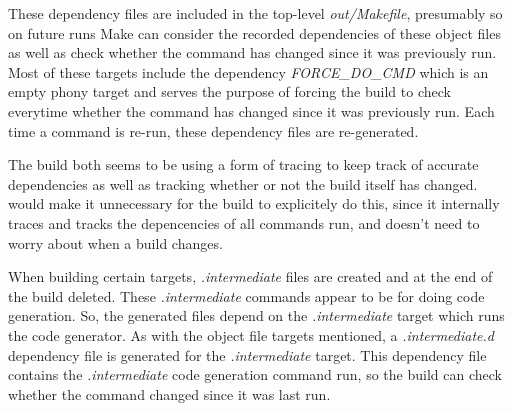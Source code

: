 These dependency files are included in the top-level \emph{out/Makefile}, presumably so on future runs Make can consider the recorded dependencies of these object files as well as check whether the command has changed since it was previously run.  Most of these targets include the dependency \emph{FORCE\_DO\_CMD} which is an empty phony target and serves the purpose of forcing the build to check everytime whether the command has changed since it was previously run. Each time a command is re-run, these dependency files are re-generated.


The build both seems to be using a form of tracing to keep track of accurate dependencies as well as tracking whether or not the build itself has changed.  \Rattle would make it unnecessary for the build to explicitely do this, since it internally traces and tracks the depencencies of all commands run, and doesn't need to worry about when a build changes.





When building certain targets, \emph{.intermediate} files are created and at the end of the build deleted.  These \emph{.intermediate} commands appear to be for doing code generation.  So, the generated files depend on the \emph{.intermediate} target which runs the code generator.  As with the object file targets mentioned, a \emph{.intermediate.d} dependency file is generated for the \emph{.intermediate} target.  This dependency file contains the \emph{.intermediate} code generation command run, so the build can check whether the command changed since it was last run.

